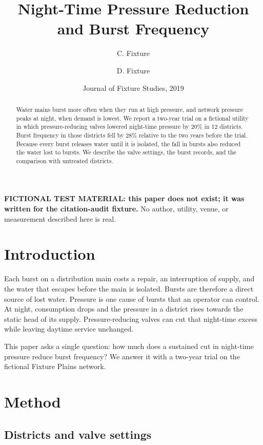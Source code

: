 \documentclass{article}
\title{Night-Time Pressure Reduction and Burst Frequency}
\author{C. Fixture \and D. Fixture}
\date{Journal of Fixture Studies, 2019}
\begin{document}
\maketitle

\noindent\textbf{FICTIONAL TEST MATERIAL: this paper does not exist; it was
written for the citation-audit fixture.} No author, utility, venue, or
measurement described here is real.

\begin{abstract}
Water mains burst more often when they run at high pressure, and network
pressure peaks at night, when demand is lowest. We report a two-year trial on
a fictional utility in which pressure-reducing valves lowered night-time
pressure by 20\% in 12 districts. Burst frequency in those districts fell by
28\% relative to the two years before the trial. Because every burst releases
water until it is isolated, the fall in bursts also reduced the water lost to
bursts. We describe the valve settings, the burst records, and the comparison
with untreated districts.
\end{abstract}

\section{Introduction}
\label{sec:introduction}

Each burst on a distribution main costs a repair, an interruption of supply,
and the water that escapes before the main is isolated. Bursts are therefore a
direct source of lost water. Pressure is one cause of bursts that an operator
can control. At night, consumption drops and the pressure in a district rises
towards the static head of its supply. Pressure-reducing valves can cut that
night-time excess while leaving daytime service unchanged.

This paper asks a single question: how much does a sustained cut in night-time
pressure reduce burst frequency? We answer it with a two-year trial on the
fictional Fixture Plains network.

\section{Method}
\label{sec:method}

\subsection{Districts and valve settings}
\label{sec:method-districts}
\end{document}
